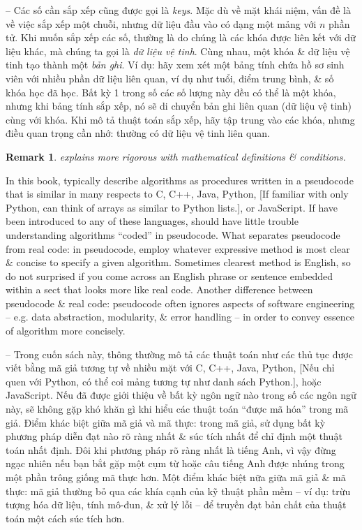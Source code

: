 \documentclass{article}
\newtheorem{remark}{Remark}
\begin{document}
\begin{itemize}
\begin{itemize}
\begin{itemize}
            -- Các số cần sắp xếp cũng được gọi là {\it keys}. Mặc dù về mặt khái niệm, vấn đề là về việc sắp xếp một chuỗi, nhưng dữ liệu đầu vào có dạng một mảng với $n$ phần tử. Khi muốn sắp xếp các số, thường là do chúng là các khóa được liên kết với dữ liệu khác, mà chúng ta gọi là {\it dữ liệu vệ tinh}. Cùng nhau, một khóa \& dữ liệu vệ tinh tạo thành một {\it bản ghi}. Ví dụ: hãy xem xét một bảng tính chứa hồ sơ sinh viên với nhiều phần dữ liệu liên quan, ví dụ như tuổi, điểm trung bình, \& số khóa học đã học. Bất kỳ 1 trong số các số lượng này đều có thể là một khóa, nhưng khi bảng tính sắp xếp, nó sẽ di chuyển bản ghi liên quan (dữ liệu vệ tinh) cùng với khóa. Khi mô tả thuật toán sắp xếp, hãy tập trung vào các khóa, nhưng điều quan trọng cần nhớ: thường có dữ liệu vệ tinh liên quan.
            
            \begin{remark}
                \cite{Knuth1998} explains more rigorous with mathematical definitions \& conditions.
            \end{remark}
            In this book, typically describe algorithms as procedures written in a pseudocode that is similar in many respects to C, C++, Java, Python, [If familiar with only Python, can think of arrays as similar to Python lists.], or JavaScript. If have been introduced to any of these languages, should have little trouble understanding algorithms ``coded'' in pseudocode. What separates pseudocode from real code: in pseudocode, employ whatever expressive method is most clear \& concise to specify a given algorithm. Sometimes clearest method is English, so do not surprised if you come across an English phrase or sentence embedded within a sect that looks more like real code. Another difference between pseudocode \& real code: pseudocode often ignores aspects of software engineering -- e.g. data abstraction, modularity, \& error handling -- in order to convey essence of algorithm more concisely.
            
            -- Trong cuốn sách này, thông thường mô tả các thuật toán như các thủ tục được viết bằng mã giả tương tự về nhiều mặt với C, C++, Java, Python, [Nếu chỉ quen với Python, có thể coi mảng tương tự như danh sách Python.], hoặc JavaScript. Nếu đã được giới thiệu về bất kỳ ngôn ngữ nào trong số các ngôn ngữ này, sẽ không gặp khó khăn gì khi hiểu các thuật toán ``được mã hóa'' trong mã giả. Điểm khác biệt giữa mã giả và mã thực: trong mã giả, sử dụng bất kỳ phương pháp diễn đạt nào rõ ràng nhất \& súc tích nhất để chỉ định một thuật toán nhất định. Đôi khi phương pháp rõ ràng nhất là tiếng Anh, vì vậy đừng ngạc nhiên nếu bạn bắt gặp một cụm từ hoặc câu tiếng Anh được nhúng trong một phần trông giống mã thực hơn. Một điểm khác biệt nữa giữa mã giả \& mã thực: mã giả thường bỏ qua các khía cạnh của kỹ thuật phần mềm -- ví dụ: trừu tượng hóa dữ liệu, tính mô-đun, \& xử lý lỗi -- để truyền đạt bản chất của thuật toán một cách súc tích hơn.
            

\end{itemize}
\end{itemize}
\end{itemize}
\end{document}
